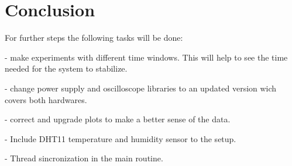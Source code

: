 \section{Conclusion}

For further steps the following tasks will be done:

- make experiments with different time windows. This will help to see the time needed for the system to stabilize.

- change power supply and oscilloscope libraries to an updated version wich covers both hardwares.

- correct and upgrade plots to make a better sense of the data.

- Include DHT11 temperature and humidity sensor to the setup.

- Thread sincronization in the main routine.